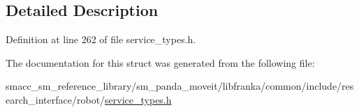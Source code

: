 \subsection{Detailed Description}


Definition at line 262 of file service\+\_\+types.\+h.



The documentation for this struct was generated from the following file\+:\begin{DoxyCompactItemize}
\item 
smacc\+\_\+sm\+\_\+reference\+\_\+library/sm\+\_\+panda\+\_\+moveit/libfranka/common/include/research\+\_\+interface/robot/\hyperlink{service__types_8h}{service\+\_\+types.\+h}\end{DoxyCompactItemize}
